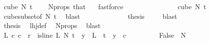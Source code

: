 \begin{isabellebody}
\ {\isachardoublequoteopen}cube\ N{\isacharprime}{\kern0pt}\ t\ {\isasymnoteq}\ {\isacharbraceleft}{\kern0pt}{\isacharbraceright}{\kern0pt}{\isachardoublequoteclose}\ \isamarkupfalse%
\ N{\isacharunderscore}{\kern0pt}props{\isacharparenleft}{\kern0pt}{}{\isacharparenright}{\kern0pt}\ that\ {}\ \isamarkupfalse%
\ fastforce\ \ \isanewline
\ \ \ \ \ \ \ \ \ \ \isamarkupfalse%
\ \isamarkupfalse%
\ {\isachardoublequoteopen}cube\ N{\isacharprime}{\kern0pt}\ {\isacharparenleft}{\kern0pt}t\ {\isacharplus}{\kern0pt}\ {}{\isacharparenright}{\kern0pt}\ {\isasymnoteq}\ {\isacharbraceleft}{\kern0pt}{\isacharbraceright}{\kern0pt}{\isachardoublequoteclose}\ \isamarkupfalse%
\ cube{\isacharunderscore}{\kern0pt}subset{\isacharbrackleft}{\kern0pt}of\ N{\isacharprime}{\kern0pt}\ t{\isacharbrackright}{\kern0pt}\ \isamarkupfalse%
\ blast\isanewline
\ \ \ \ \ \ \ \ \ \ \isamarkupfalse%
\ \isamarkupfalse%
\ {\isacharquery}{\kern0pt}thesis\ \isamarkupfalse%
\ {}\ \isamarkupfalse%
\ blast\isanewline
\ \ \ \ \ \ \ \ \isamarkupfalse%
\isanewline
\ \ \ \ \ \ \ \ \isamarkupfalse%
\ \isamarkupfalse%
\ {\isacharquery}{\kern0pt}thesis\ \isamarkupfalse%
\ lhj{\isacharunderscore}{\kern0pt}def\ \isamarkupfalse%
\ N{\isacharunderscore}{\kern0pt}props{\isacharparenleft}{\kern0pt}{}{\isacharparenright}{\kern0pt}\ \isamarkupfalse%
\ blast\isanewline
\ \ \ \ \ \ \isamarkupfalse%
\isanewline
\ \ \ \ \ \ \ \ \isamarkupfalse%
\ {}\isanewline
\ \ \ \ \ \ \ \ \isamarkupfalse%
\ \isamarkupfalse%
\ {\isachardoublequoteopen}{\isacharparenleft}{\kern0pt}{\isasymexists}L\ c{\isachardot}{\kern0pt}\ c\ {\isacharless}{\kern0pt}\ r\ {\isasymand}\ is{\isacharunderscore}{\kern0pt}line\ L\ N{\isacharprime}{\kern0pt}\ t\ {\isasymand}\ {\isacharparenleft}{\kern0pt}{\isasymforall}y\ {\isasymin}\ L\ {\isacharbackquote}{\kern0pt}\ {\isacharbraceleft}{\kern0pt}{\isachardot}{\kern0pt}{\isachardot}{\kern0pt}{\isacharless}{\kern0pt}t{\isacharbraceright}{\kern0pt}{\isachardot}{\kern0pt}\ {\isasymchi}\ y\ {\isacharequal}{\kern0pt}\ c{\isacharparenright}{\kern0pt}{\isacharparenright}{\kern0pt}\isanewline
\ \ \ \ \ \ \ \ {\isasymLongrightarrow}\ False{\isachardoublequoteclose}\ \ N{\isacharprime}{\kern0pt}\ {\isasymchi}\ \isamarkupfalse%

\end{isabellebody}
